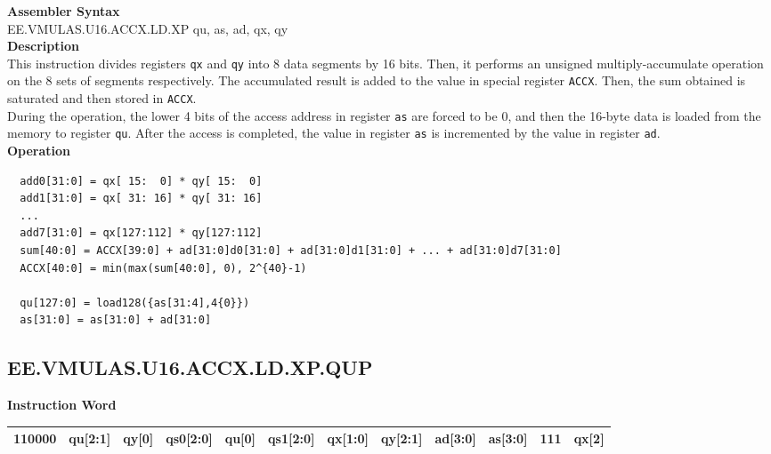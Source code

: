 \textbf{Assembler Syntax} \\
EE.VMULAS.U16.ACCX.LD.XP qu, as, ad, qx, qy \\
\textbf{Description} \\
This instruction divides registers \lstinline{qx} and \lstinline{qy} into 8 data segments by 16 bits. Then, it performs an unsigned multiply-accumulate operation on the 8 sets of segments respectively. The accumulated result is added to the value in special register \lstinline{ACCX}. Then, the sum obtained is saturated and then stored in \lstinline{ACCX}.\\
During the operation, the lower 4 bits of the access address in register \lstinline{as} are forced to be 0, and then the 16-byte data is loaded from the memory to register \lstinline{qu}. After the access is completed, the value in register \lstinline{as} is incremented by the value in register \lstinline{ad}.\\
\textbf{Operation}
\begin{lstlisting}
  add0[31:0] = qx[ 15:  0] * qy[ 15:  0]
  add1[31:0] = qx[ 31: 16] * qy[ 31: 16]
  ...
  add7[31:0] = qx[127:112] * qy[127:112]
  sum[40:0] = ACCX[39:0] + ad[31:0]d0[31:0] + ad[31:0]d1[31:0] + ... + ad[31:0]d7[31:0]
  ACCX[40:0] = min(max(sum[40:0], 0), 2^{40}-1)

  qu[127:0] = load128({as[31:4],4{0}})
  as[31:0] = as[31:0] + ad[31:0]
\end{lstlisting}

\clearpage
\subsection{EE.VMULAS.U16.ACCX.LD.XP.QUP}\label{instruction:EEVMULASU16ACCXLDXPQUP}
\setlength\tabcolsep{6pt}
\textbf{Instruction Word} \\
\begin{tabular}{|c|c|c|c|c|c|c|c|c|c|c|c|}
	\hline
	110000 & qu[2:1] & qy[0] & qs0[2:0] & qu[0] & qs1[2:0] & qx[1:0] & qy[2:1] & ad[3:0] & as[3:0] & 111 & qx[2] \\
	\hline
\end{tabular}

